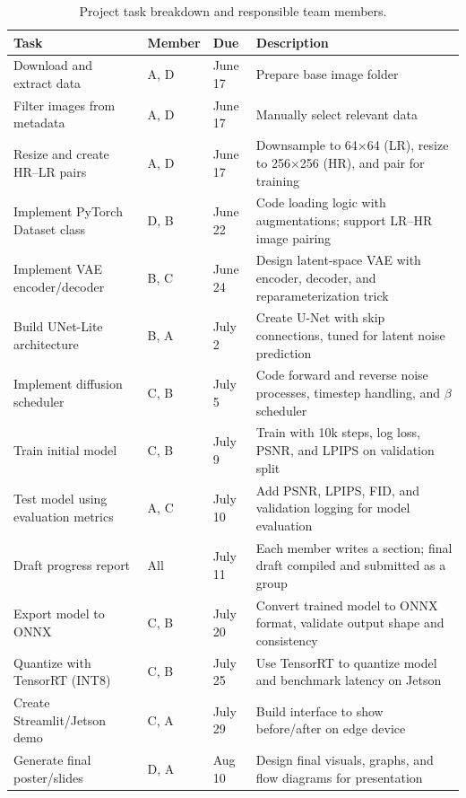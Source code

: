 \documentclass{article} %
\begin{document}
\newpage
\begin{table}[h!]
\captionsetup{justification=centering}
\caption{Project task breakdown and responsible team members.}
\label{task-table}
\centering
\renewcommand{\arraystretch}{1} 
\setlength{\tabcolsep}{6pt}       %
\begin{tabularx}{\textwidth}{>{\raggedright\arraybackslash}X >{\centering\arraybackslash}m{1cm} >{\centering\arraybackslash}m{1.5cm} >{\raggedright\arraybackslash}m{7cm}}
\textbf{Task} & \textbf{Member} & \textbf{Due} & \textbf{Description} \\
\midrule
Download and extract data & A, D & June 17 & Prepare base image folder \\
\addlinespace
Filter images from metadata & A, D & June 17 & Manually select relevant data \\
\addlinespace
Resize and create HR–LR pairs & A, D & June 17 & Downsample to 64×64 (LR), resize to 256×256 (HR), and pair for training \\
\addlinespace
Implement PyTorch Dataset class & D, B & June 22 & Code loading logic with augmentations; support LR–HR image pairing \\
\addlinespace
Implement VAE encoder/decoder & B, C & June 24 & Design latent-space VAE with encoder, decoder, and reparameterization trick \\
\addlinespace
Build UNet-Lite architecture & B, A & July 2 & Create U-Net with skip connections, tuned for latent noise prediction \\
\addlinespace
Implement diffusion scheduler & C, B & July 5 & Code forward and reverse noise processes, timestep handling, and $\beta$ scheduler \\
\addlinespace
Train initial model & C, B & July 9 & Train with 10k steps, log loss, PSNR, and LPIPS on validation split \\
\addlinespace
Test model using evaluation metrics & A, C & July 10 & Add PSNR, LPIPS, FID, and validation logging for model evaluation \\
\addlinespace
Draft progress report & All & July 11 & Each member writes a section; final draft compiled and submitted as a group \\
\addlinespace
Export model to ONNX & C, B & July 20 & Convert trained model to ONNX format, validate output shape and consistency \\
\addlinespace
Quantize with TensorRT (INT8) & C, B & July 25 & Use TensorRT to quantize model and benchmark latency on Jetson \\
\addlinespace
Create Streamlit/Jetson demo & C, A & July 29 & Build interface to show before/after on edge device \\
\addlinespace
Generate final poster/slides & D, A & Aug 10 & Design final visuals, graphs, and flow diagrams for presentation \\
\bottomrule
\end{tabularx}
\end{table}
\end{document}
